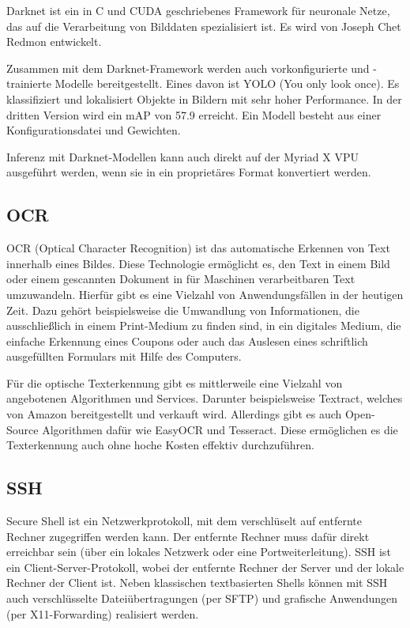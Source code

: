 Darknet ist ein in C und CUDA geschriebenes Framework für neuronale Netze, das auf die Verarbeitung von Bilddaten spezialisiert ist. Es wird von Joseph Chet Redmon entwickelt. \autocite[Vgl.][]{darknet13}

Zusammen mit dem Darknet-Framework werden auch vorkonfigurierte und -trainierte Modelle bereitgestellt. Eines davon ist YOLO (You only look once). Es klassifiziert und lokalisiert Objekte in Bildern mit sehr hoher Performance. In der dritten Version wird ein mAP von 57.9 erreicht. Ein Modell besteht aus einer Konfigurationsdatei und Gewichten. \autocite[Vgl.][]{yolov3} %

Inferenz mit Darknet-Modellen kann auch direkt auf der Myriad X VPU ausgeführt werden, wenn sie in ein proprietäres Format konvertiert werden.

\subsection{OCR}
OCR (Optical Character Recognition) ist das automatische Erkennen von Text innerhalb eines Bildes. Diese Technologie ermöglicht es, den Text in einem Bild oder einem gescannten Dokument in für Maschinen verarbeitbaren Text umzuwandeln. Hierfür gibt es eine Vielzahl von Anwendungsfällen in der heutigen Zeit. Dazu gehört beispielsweise die Umwandlung von Informationen, die ausschließlich in einem Print-Medium zu finden sind, in ein digitales Medium, die einfache Erkennung eines Coupons oder auch das Auslesen eines schriftlich ausgefüllten Formulars mit Hilfe des Computers.\autocite[Vgl.][S. 81]{ocr1}

Für die optische Texterkennung gibt es mittlerweile eine Vielzahl von angebotenen Algorithmen und Services. Darunter beispielsweise Textract, welches von Amazon bereitgestellt und verkauft wird. Allerdings gibt es auch Open-Source Algorithmen dafür wie EasyOCR und Tesseract. Diese ermöglichen es die Texterkennung auch ohne hoche Kosten effektiv durchzuführen.
																																																																																																																																																												   

\subsection{SSH}
Secure Shell ist ein Netzwerkprotokoll, mit dem verschlüselt auf entfernte Rechner zugegriffen werden kann. Der entfernte Rechner muss dafür direkt erreichbar sein (über ein lokales Netzwerk oder eine Portweiterleitung).
SSH ist ein Client-Server-Protokoll, wobei der entfernte Rechner der Server und der lokale Rechner der Client ist. Neben klassischen textbasierten Shells können mit SSH auch verschlüsselte Dateiübertragungen (per SFTP) und grafische Anwendungen (per X11-Forwarding) realisiert werden. \autocite[Vgl.][]{bibid}

